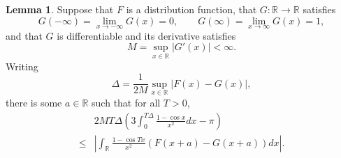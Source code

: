 \documentclass{article}
\theoremstyle{definition}
\newtheorem{lemma}[theorem]{Lemma}
\theoremstyle{definition}
\begin{document}
\begin{lemma}
Suppose that $F$ is a distribution function, that $G:\mathbb{R} \to \mathbb{R}$ satisfies
\[
G(-\infty)=\lim_{x \to -\infty} G(x) = 0, \qquad G(\infty) = \lim_{x \to \infty} G(x)=1,
\]
and that $G$ is differentiable and its derivative satisfies
\begin{equation}
M=\sup_{x \in \mathbb{R}} |G'(x)| < \infty.
\label{derivative}
\end{equation}
Writing
\[
\Delta = \frac{1}{2M} \sup_{x \in \mathbb{R}} |F(x)-G(x)|,
\]
there is some $a \in \mathbb{R}$ such that for all $T>0$,
\[
\begin{split}
&2MT\Delta \left(3\int_0^{T\Delta} \frac{1-\cos x}{x^2} dx - \pi\right)\\
\leq& \left| \int_\mathbb{R} \frac{1-\cos Tx}{x^2} (F(x+a)-G(x+a)) dx \right|.
\end{split}
\]
\label{esseen}
\end{lemma}
\end{document}
